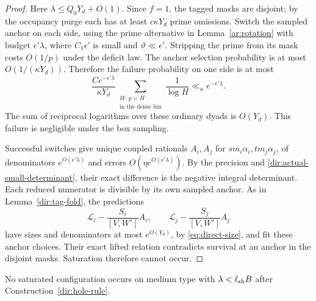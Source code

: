 \begin{proof}
Here $\lambda\le Q_0Y_d+O(1)$. Since $f=1$, the tagged masks are
disjoint; by the occupancy purge each has at least $c\kappa Y_d$
prime omissions. Switch the sampled anchor on each side, using the
prime alternative in Lemma~\ref{ar:rotation} with budget
$\epsilon'\lambda$, where
$C_1\epsilon'$ is small and $\vartheta\ll\epsilon'$. Stripping the
prime from its mask costs $O(1/p)$ under the deficit law. The anchor
selection probability is at most $O(1/(\kappa Y_d))$. Therefore the
failure probability on one side is at most
\[
 \frac{C e^{-\epsilon'\lambda}}{\kappa Y_d}
 \sum_{\substack{H:\ p\asymp H\\\text{in the dense bin}}}
       \frac1{\log H}
 \ll_\kappa e^{-\epsilon'\lambda}.
\]
The sum of reciprocal logarithms over these ordinary dyads is
$O(Y_d)$. This failure is negligible under the box sampling.

Successful switches give unique coupled rationals $A_i,A_j$ for
$s m_i\alpha_i,t m_j\alpha_j$, of denominators
$e^{O(\epsilon'\lambda)}$ and errors
$O(\eta e^{O(\epsilon'\lambda)})$. By the precision and
\eqref{dir:actual-small-determinant}, their exact difference is the
negative integral determinant. Each reduced numerator is divisible
by its own sampled anchor. As in Lemma~\ref{dir:tag-fold}, the
predictions
\[
 \mathcal L_i-\frac{S_i}{[V,W']}A_i,\qquad
 \mathcal L_j-\frac{S_j}{[V,W']}A_j
\]
have sizes and denominators at most $e^{O(Y_d)}$, by
\eqref{eq:direct-size}, and fit these anchor choices. Their exact
lifted relation contradicts survival at an anchor in the disjoint
masks. Saturation therefore cannot occur.
\end{proof}

\begin{lemma}\label{dir:shallow-box}
No saturated configuration occurs on medium type with
$\lambda<\ell_{\rm sh}B$ after Construction~\ref{dir:hole-rule}.
\end{lemma}

